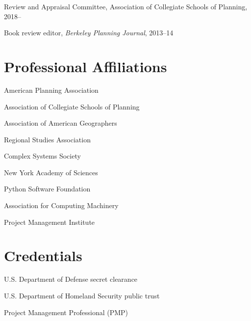 \documentclass[12pt,letterpaper]{report}
\newcommand{\listitemspace}{0.15em}
\renewenvironment{itemize}
{\begin{list}{}{\setlength{\leftmargin}{0em}
				\setlength{\parskip}{0em}
				\setlength{\itemsep}{\listitemspace}
				\setlength{\parsep}{\listitemspace}}}
{\end{list}}
\begin{document}
\begin{itemize}

\item Review and Appraisal Committee, Association of Collegiate Schools of Planning, 2018--	

\item Book review editor, \textit{Berkeley Planning Journal}, 2013--14

\end{itemize}



\section*{Professional Affiliations}

\begin{itemize}
	
\item American Planning Association

\item Association of Collegiate Schools of Planning

\item Association of American Geographers

\item Regional Studies Association

\item Complex Systems Society

\item New York Academy of Sciences

\item Python Software Foundation

\item Association for Computing Machinery

\item Project Management Institute

\end{itemize}



\section*{Credentials}

\begin{itemize}
	
\item U.S. Department of Defense secret clearance

\item U.S. Department of Homeland Security public trust

\item Project Management Professional (PMP)

\end{itemize}
\end{document}
